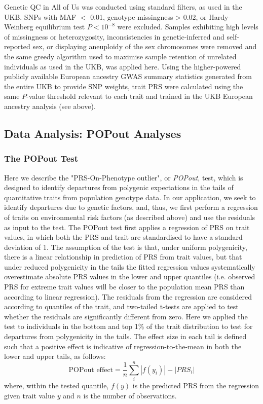 \documentclass[12pt]{zHenriquesLab-StyleBioRxiv}
\begin{document}
Genetic QC in All of Us was conducted using standard filters, as used in the UKB.  SNPs with MAF $<$ 0.01, genotype missingness > 0.02, or Hardy-Weinberg equilibrium test 
$P < 10^{-8}$ were excluded. Samples exhibiting high levels of missingness or heterozygosity, 
inconsistencies in genetic-inferred and self-reported sex, or displaying aneuploidy of the sex 
chromosomes were removed and the same greedy algorithm used to maximise sample 
retention of unrelated individuals as used in the UKB, was applied here. Using the higher-powered 
publicly available European ancestry GWAS summary statistics generated from the entire UKB \cite{neale} to provide SNP weights, trait PRS were calculated \cite{prsice} using the same $P$-value threshold relevant to each trait and trained in the UKB European ancestry analysis (see above). 




\vspace*{0.3cm} 
\subsection*{Data Analysis: POPout Analyses} \label{sec:methods:popout} 
\vspace*{-0.4cm} 
\subsubsection*{The POPout Test}
Here we describe the "PRS-On-Phenotype outlier", or \emph{POPout}, test, which is 
designed to identify departures from polygenic expectations in the tails of 
quantitative traits from population genotype data. In our application, we seek to identify 
departures due to genetic factors, and, thus, we first perform a regression of traits on 
environmental risk factors (as described above) and use the residuals as input to the test. The POPout test first applies a regression of PRS on trait values, in which both the PRS and trait are standardised to have a standard deviation of 1. The assumption of the test is that, under uniform polygenicity, there is a linear relationship in prediction of PRS from trait values, but that under reduced polygenicity in the tails the fitted regression values systematically overestimate absolute PRS values in the lower and upper quantiles (i.e. observed PRS for extreme trait values will be closer to the population mean PRS than according to linear regression). The residuals from the regression are considered according to quantiles of the trait, and two-tailed t-tests are applied to test whether the residuals are significantly different from zero. Here we applied the test to individuals in the bottom and top 1\% of the trait distribution to test for departures from polygenicity in the tails. The effect size in each tail is defined such that a positive effect is indicative of regression-to-the-mean in both the lower and upper tails, as follows:
\[
\text{POPout effect} = \frac{1}{n}\sum_i^n |{f(y_i)}| - |{PRS_i}|
\]
where, within the tested quantile, $f(y)$ is the predicted PRS from the regression given trait
value $y$ and $n$ is the number of observations.
\end{document}
